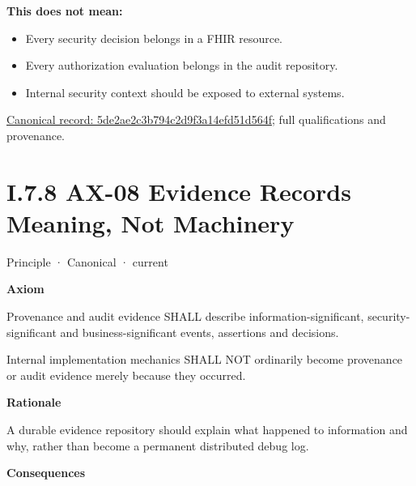 \textbf{This does not mean:}



\begin{itemize}


\item Every security decision belongs in a FHIR resource.

\item Every authorization evaluation belongs in the audit repository.

\item Internal security context should be exposed to external systems.

\end{itemize}

{\footnotesize \href{../../../../continuum/motivation/principle/5de2ae2c3b794c2d9f3a14efd51d564f.md}{Canonical record: 5de2ae2c3b794c2d9f3a14efd51d564f}; full qualifications and provenance.}\par
\section*{I.7.8 AX-08 Evidence Records Meaning, Not Machinery}
\label{navigation:I.7.8}

\label{element:21d6864657964ba5b03e3f6b5eb29cd5}
{\small Principle · Canonical · current}\par

\par\medskip\textbf{Axiom}\par


Provenance and audit evidence SHALL describe information-significant,
security-significant and business-significant events, assertions and
decisions.



Internal implementation mechanics SHALL NOT ordinarily become provenance
or audit evidence merely because they occurred.



\par\medskip\textbf{Rationale}\par


A durable evidence repository should explain what happened to
information and why, rather than become a permanent distributed debug
log.



\par\medskip\textbf{Consequences}\par


